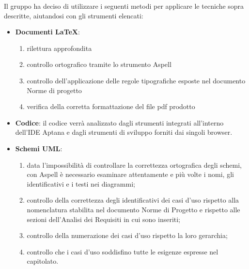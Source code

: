 Il gruppo ha deciso di utilizzare i seguenti metodi per applicare le tecniche sopra descritte, aiutandosi con gli strumenti elencati:
\begin{itemize}
\item \textbf{Documenti \LaTeX}:
\begin{enumerate}
\item rilettura approfondita
\item controllo ortografico tramite lo strumento Aspell
\item controllo dell'applicazione delle regole tipografiche esposte nel documento Norme di progetto
\item verifica della corretta formattazione del file pdf prodotto
\end{enumerate}

\item \textbf{Codice}: il codice verrà analizzato dagli strumenti integrati all'interno dell'IDE Aptana e dagli strumenti di sviluppo forniti dai singoli browser.

\item \textbf{Schemi UML}:
\begin{enumerate}
	\item data l'impossibilità di controllare la correttezza ortografica degli schemi, con Aspell è necessario esaminare attentamente e più volte i nomi, gli identificativi e i testi nei diagrammi;
	\item controllo della correttezza degli identificativi dei casi d'uso rispetto alla nomenclatura stabilita nel documento Norme di Progetto e rispetto alle sezioni dell'Analisi dei Requisiti in cui sono inseriti;
	\item controllo della numerazione dei casi d'uso rispetto la loro gerarchia;
	\item controllo che i casi d'uso soddisfino tutte le esigenze espresse nel capitolato.
\end{enumerate}
\end{itemize}
